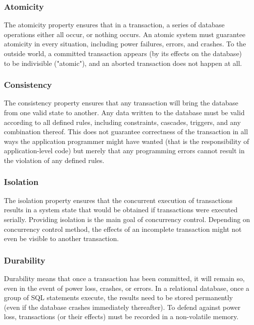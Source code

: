     \subsubsection{Atomicity}
      The atomicity property ensures that in a transaction, a series of database operations either all occur, or nothing occurs. An atomic system must guarantee atomicity in every situation, including power failures, errors, and crashes. To the outside world, a committed transaction appears (by its effects on the database) to be indivisible ("atomic"), and an aborted transaction does not happen at all.

    \subsubsection{Consistency}
      The consistency property ensures that any transaction will bring the database from one valid state to another. Any data written to the database must be valid according to all defined rules, including constraints, cascades, triggers, and any combination thereof. This does not guarantee correctness of the transaction in all ways the application programmer might have wanted (that is the responsibility of application-level code) but merely that any programming errors cannot result in the violation of any defined rules.

    \subsubsection{Isolation}
      The isolation property ensures that the concurrent execution of transactions results in a system state that would be obtained if transactions were executed serially. Providing isolation is the main goal of concurrency control. Depending on concurrency control method, the effects of an incomplete transaction might not even be visible to another transaction.

    \subsubsection{Durability}
      Durability means that once a transaction has been committed, it will remain so, even in the event of power loss, crashes, or errors. In a relational database, once a group of SQL statements execute, the results need to be stored permanently (even if the database crashes immediately thereafter). To defend against power loss, transactions (or their effects) must be recorded in a non-volatile memory.

